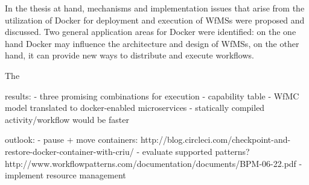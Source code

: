
In the thesis at hand, mechanisms and implementation issues that arise from the utilization of Docker for deployment and execution of \acp{WfMS} were proposed and discussed. Two general application areas for Docker were identified: on the one hand Docker may influence the architecture and design of \acp{WfMS}, on the other hand, it can provide new ways to distribute and execute workflows.

The

results:
  - three promising combinations for execution
  - capability table
  - WfMC model translated to docker-enabled microservices
  - statically compiled activity/workflow would be faster

outlook:
  - pause + move containers: http://blog.circleci.com/checkpoint-and-restore-docker-container-with-criu/
  - evaluate supported patterns?  http://www.workflowpatterns.com/documentation/documents/BPM-06-22.pdf
  - implement resource management
